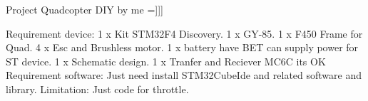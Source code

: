 Project Quadcopter D\+IY by me =\mbox{]}\mbox{]}\mbox{]}

Requirement device\+: 1 x Kit S\+T\+M32\+F4 Discovery. 1 x G\+Y-\/85. 1 x F450 Frame for Quad. 4 x Esc and Brushless motor. 1 x battery have B\+ET can supply power for ST device. 1 x Schematic design. 1 x Tranfer and Reciever M\+C6C it\textquotesingle{}s OK Requirement software\+: Just need install S\+T\+M32\+Cube\+Ide and related software and library. Limitation\+: Just code for throttle. 